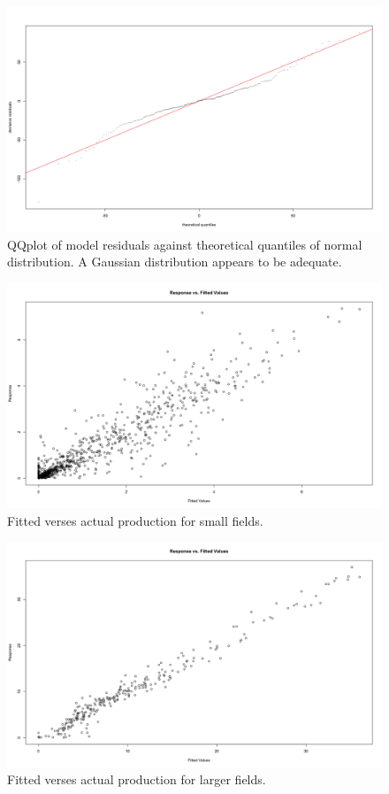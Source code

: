 \documentclass[12pt]{article}
\begin{document}
\begin{figure}
	\includegraphics[width=.8\textwidth]{figures/qq_gam_price_over_2d.png}
	\caption{QQplot of model residuals against theoretical quantiles of normal distribution.  A Gaussian distribution appears to be adequate.}
	\label{chart:qqplot}
\end{figure}

\begin{figure}
	\includegraphics[width=.8\textwidth]{figures/under_fitted.png}
	\caption{Fitted verses actual production for small fields.}
	\label{chart:under_fitted}
\end{figure}

\begin{figure}
	\includegraphics[width=.8\textwidth]{figures/over_fitted.png}
	\caption{Fitted verses actual production for larger fields.}
	\label{chart:under_fitted}
\end{figure}
\end{document}
